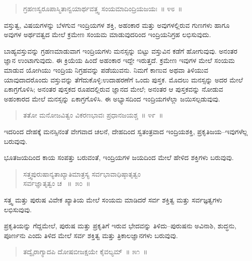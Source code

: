 \begin{verse}
ಗ್ರಹಣಸ್ವರೂಪಾಸ್ಮಿತಾನ್ವಯಾರ್ಥವತ್ತ್ವ ಸಂಯಮಾದಿಂದ್ರಿಯಜಯಃ~॥ ೪೮~॥
\end{verse}

\vspace{-0.3cm}

ವಸ್ತುತ್ವ, ವಿಷಯಗಳನ್ನು ಬೆಳಗುವ ಇಂದ್ರಿಯಗಳ ಶಕ್ತಿ, ಅಹಂಕಾರ ಮತ್ತು ಅವುಗಳಲ್ಲಿರುವ ಗುಣಗಳು ಹಾಗೂ ಅವುಗಳ ಅರ್ಥವತ್ವದ ಮೇಲೆ ಕ್ರಮೇಣ ಸಂಯಮ ಮಾಡುವುದರಿಂದ ಇಂದ್ರಿಯನಿಗ್ರಹ ಲಭಿಸುವುದು. 

ಬಾಹ್ಯವಸ್ತುವನ್ನು ಗ್ರಹಣಮಾಡುವಾಗ ಇಂದ್ರಿಯಗಳು ಮನಸ್ಸನ್ನು ಬಿಟ್ಟು ವಸ್ತುವಿನ ಕಡೆಗೆ ಹೋಗುವುವು. ಅನಂತರ ಜ್ಞಾನ ಉಂಟಾಗುವುದು. ಈ ಕ್ರಿಯೆಯ ಹಿಂದೆ ಅಹಂಕಾರ ಇದ್ದೇ ಇರುತ್ತದೆ. ಕ್ರಮೇಣ ಇವುಗಳ ಮೇಲೆ ಸಂಯಮ ಮಾಡುವ ಯೋಗಿಯು ಇಂದ್ರಿಯ ನಿಗ್ರಹವನ್ನು ಪಡೆಯುವನು. ನಿಮಗೆ ಕಾಣುವ ಅಥವಾ ತಿಳಿಯುವ ಯಾವುದಾದರೊಂದು ವಸ್ತುವನ್ನು ತೆಗೆದುಕೊಳ್ಳಿ:ಉದಾಹರಣೆಗೆ ಒಂದು ಪುಸ್ತಕ. ಮೊದಲು ಮನಸ್ಸನ್ನು ಅದರ ಮೇಲೆ ಏಕಾಗ್ರಗೊಳಿಸಿ; ಅನಂತರ ಪುಸ್ತಕದ ರೂಪದಲ್ಲಿರುವ ಜ್ಞಾನದ ಮೇಲೆ; ಅನಂತರ ಆ ಪುಸ್ತಕವನ್ನು ನೋಡುವ ಅಹಂಕಾರದ ಮೇಲೆ ಮನಸ್ಸನ್ನು ಏಕಾಗ್ರಗೊಳಿಸಿ. ಈ ಅಭ್ಯಾಸದಿಂದ ಇಂದ್ರಿಯಗಳೆಲ್ಲಾ ಜಯಿಸಲ್ಪಡುವುವು. 

\vspace{-0.3cm}

\begin{verse}
ತತೋ ಮನೋಜವಿತ್ವಂ ವಿಕರಣಭಾವಃ ಪ್ರಧಾನಜಯಶ್ಚ~॥ ೪೯~॥
\end{verse}

\vspace{-0.3cm}

ಇದರಿಂದ ದೇಹಕ್ಕೆ ಮನಸ್ಸಿನಂತೆ ವೇಗವಾದ ಚಲನೆ, ದೇಹದಿಂದ ಸ್ವತಂತ್ರವಾದ ಇಂದ್ರಿಯಶಕ್ತಿ, ಪ್ರಕೃತಿಜಯ–ಇವುಗಳೆಲ್ಲ ಬರುವುವು. 

ಭೂತಜಯದಿಂದ ಕಾಯ ಸಂಪತ್ತು ಬರುವಂತೆ, ಇಂದ್ರಿಯಗಳ ಜಯದಿಂದ ಮೇಲೆ ಹೇಳಿದ ಶಕ್ತಿಗಳು ಬರುವುವು. 

\vspace{-0.3cm}

\begin{verse}
ಸತ್ತ್ವಪುರುಷಾನ್ಯತಾಖ್ಯಾತಿಮಾತ್ರಸ್ಯ ಸರ್ವಭಾವಾಧಿಷ್ಠಾತೃತ್ವಂ\\ ಸರ್ವಜ್ಞಾತೃತ್ವಂ ಚ~ \hfill{॥~೫೦~॥}
\end{verse}

\vspace{-0.3cm}

ಸತ್ತ್ವ ಮತ್ತು ಪುರುಷ ವಿವೇಕ ಖ್ಯಾತಿಯ ಮೇಲೆ ಸಂಯಮ ಮಾಡಿದರೆ ಸರ್ವ ಶಕ್ತಿತ್ವ ಮತ್ತು ಸರ್ವಜ್ಞತ್ವಗಳು ಲಭಿಸುವುವು. 

ಪ್ರಕೃತಿಯನ್ನು ಗೆದ್ದಮೇಲೆ, ಪುರುಷ ಮತ್ತು ಪ್ರಕೃತಿಗೆ ಇರುವ ಭೇದವನ್ನು ತಿಳಿದು–ಪುರುಷನು ಅವಿನಾಶಿ, ಶುದ್ಧನು, ಪೂರ್ಣನು ಎಂದು ತಿಳಿದ ಮೇಲೆ ಸರ್ವ ಶಕ್ತಿತ್ವ ಮತ್ತು ತ್ರಿಕಾಲಜ್ಞಾನಗಳು ಬರುವುವು. 

\vspace{-0.3cm}

\begin{verse}
ತದ್ವೈರಾಗ್ಯಾದಪಿ ದೋಷಬೀಜಕ್ಷಯೇ ಕೈವಲ್ಯಮ್​~॥ ೫೧~॥
\end{verse}

